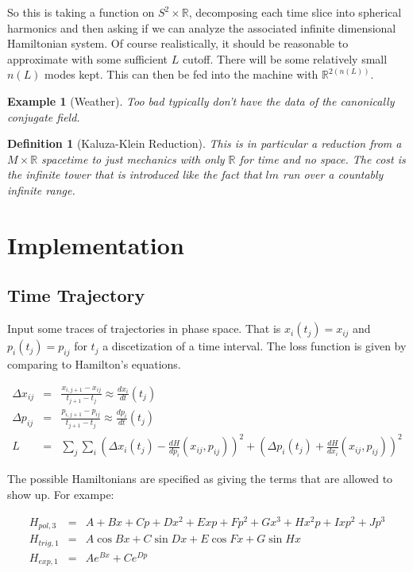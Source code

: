 \documentclass[a4paper,landscape]{article}
\theoremstyle{change}
\newtheorem{definition}[equation]{Definition}
\newtheorem{example}[equation]{Example}
\theoremstyle{nonumberplain}
\numberwithin{equation}{section}
\begin{document}
So this is taking a function on $S^2 \times \mathbb{R}$, decomposing each time slice into spherical harmonics and then asking if we can analyze the associated infinite dimensional Hamiltonian system. Of course realistically, it should be reasonable to approximate with some sufficient $L$ cutoff. There will be some relatively small $n(L)$ modes kept. This can then be fed into the machine with $\mathbb{R}^{2(n(L))}$.

\begin{example}[Weather]
Too bad typically don't have the data of the canonically conjugate field.
\end{example}

\begin{definition}[Kaluza-Klein Reduction]
This is in particular a reduction from a $M \times \mathbb{R}$ spacetime to just mechanics with only $\mathbb{R}$ for time and no space. The cost is the infinite tower that is introduced like the fact that $lm$ run over a countably infinite range.
\end{definition}

\section{Implementation}

\subsection{Time Trajectory}

Input some traces of trajectories in phase space. That is $x_i (t_j) = x_{ij}$ and $p_i (t_j)=p_{ij}$ for $t_j$ a discetization of a time interval. The loss function is given by comparing to Hamilton's equations.

\begin{eqnarray*}
\Delta x_{ij} &=& \frac{x_{i,j+1} - x_{ij}}{t_{j+1} - t_j} \approx \frac{dx_i}{dt} (t_j)\\
\Delta p_{ij} &=& \frac{p_{i,j+1} - p_{ij}}{t_{j+1} - t_j} \approx \frac{dp_i}{dt} (t_j)\\
L &=& \sum_j \sum_i (\Delta x_i (t_j)  - \frac{dH}{dp_i} (x_{ij} , p_{ij} ))^2 + (\Delta p_i (t_j)  + \frac{dH}{dx_i} (x_{ij} , p_{ij} ))^2
\end{eqnarray*}

The possible Hamiltonians are specified as giving the terms that are allowed to show up. For exampe:

\begin{eqnarray*}
H_{pol,3} &=& A + Bx + Cp + Dx^2 + E xp + Fp^2 + G x^3 + H x^2 p + I xp^2 + J p^3\\
H_{trig,1} &=& A \cos B x + C \sin D x + E \cos F x + G \sin H x\\
H_{exp,1} &=& A e^{Bx} + C e^{Dp}\\
\end{eqnarray*}
\end{document}

